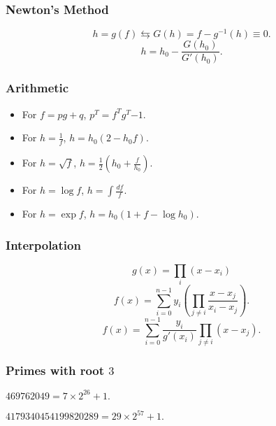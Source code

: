 \subsubsection{Newton's Method}
$$h=g(f) \leftrightarrows G(h)=f-g^{-1}(h)\equiv 0.$$
$$h=h_0-\frac{G(h_0)}{G'(h_0)}.$$

\subsubsection{Arithmetic}
\begin{itemize}
    \item For $f=pg+q$, $p^T=f^Tg^T{-1}$.

    \item For $h=\frac1{f}$, $h=h_0(2-h_0f)$.

    \item For $h=\sqrt{f}$, $h=\frac12(h_0+\frac{f}{h_0})$.

    \item For $h=\log f$, $h=\int\frac{df}{f}$.

    \item For $h=\exp f$, $h=h_0(1+f-\log h_0)$.
\end{itemize}
\subsubsection{Interpolation}

$$g(x)=\prod_{i}(x-x_i)$$
$$f(x)=\sum_{i=0}^{n-1}y_i(\prod_{j\ne i}\frac{x-x_j}{x_i-x_j}).$$
$$f(x)=\sum_{i=0}^{n-1}\frac{y_i}{g'(x_i)}\prod_{j\ne i}(x-x_j).$$

\subsubsection{Primes with root $3$}
$469762049=7\times2^{26} + 1.$

\noindent $4179340454199820289=29\times2^{57}+1.$
